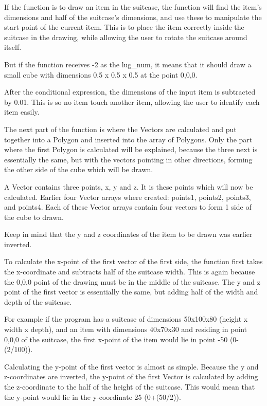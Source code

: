 If the function is to draw an item in the suitcase, the function will find the item's dimensions and half of the suitcase's dimensions, and use these to manipulate the start point of the current item. This is to place the item correctly inside the suitcase in the drawing, while allowing the user to rotate the suitcase around itself. 

But if the function receives -2 as the lug\_num, it means that it should draw a small cube with dimensions 0.5 x 0.5 x 0.5 at the point 0,0,0.

After the conditional expression, the dimensions of the input item is subtracted by 0.01. This is so no item touch another item, allowing the user to identify each item easily. 

The next part of the function is where the Vectors are calculated and put together into a Polygon and inserted into the array of Polygons. Only the part where the first Polygon is calculated will be explained, because the three next is essentially the same, but with the vectors pointing in other directions, forming the other side of the cube which will be drawn.

A Vector contains three points, x, y and z. It is these points which will now be calculated. Earlier four Vector arrays where created: points1, points2, points3, and points4. Each of these Vector arrays contain four vectors to form 1 side of the cube to drawn. 

Keep in mind that the y and z coordinates of the item to be drawn was earlier inverted. 

To calculate the x-point of the first vector of the first side, the function first takes the x-coordinate and subtracts half of the suitcase width. This is again because the 0,0,0 point of the drawing must be in the middle of the suitcase. The y and z point of the first vector is essentially the same, but adding half of the width and depth of the suitcase.


For example if the program has a suitcase of dimensions 50x100x80 (height x width x depth), and an item with dimensions 40x70x30 and residing in point 0,0,0 of the suitcase, the first x-point of the item would lie in point -50 (0-(2/100)). 

Calculating the y-point of the first vector is almost as simple. Because the y and z-coordinates are inverted, the y-point of the first Vector is calculated by adding the z-coordinate to the half of the height of the suitcase. This would mean that the y-point would lie in the y-coordinate 25 (0+(50/2)).

